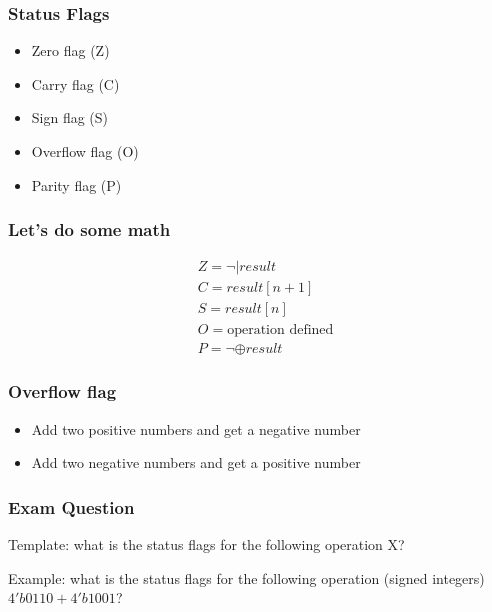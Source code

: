 \begin{frame}
    \frametitle{Status Flags}
    \begin{itemize}
        \item Zero flag (Z)
        \item Carry flag (C)
        \item Sign flag (S)
        \item Overflow flag (O)
        \item Parity flag (P)
    \end{itemize}
\end{frame}

\begin{frame}
    \frametitle{Let's do some math}
    \begin{equation}
        \begin{aligned}
            &Z=\neg | result\\
            &C=result[n+1]\\
            &S=result[n]\\
            &O=\text{operation defined}\\
            &P=\neg \oplus result
        \end{aligned}
    \end{equation}
\end{frame}

\begin{frame}
    \frametitle{Overflow flag}
    \begin{itemize}
        \item Add two positive numbers and get a negative number
        \item Add two negative numbers and get a positive number
    \end{itemize}
\end{frame}

\begin{frame}
    \frametitle{Exam Question}
    Template: what is the status flags for the following operation X?

    Example: what is the status flags for the following operation (signed integers) $4'b0110+4'b1001$?
\end{frame}
    